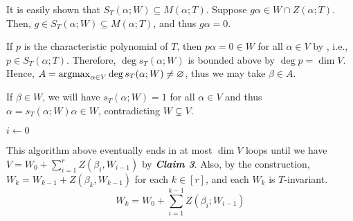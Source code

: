 \documentclass[MAS212_Note.tex]{subfiles}
\begin{document}
{    

    It is easily shown that \(S_T(\alpha; W) \subseteq M(\alpha; T)\).
    Suppose \(g \alpha \in W \cap Z(\alpha; T)\).
    Then, \(g \in S_T(\alpha; W) \subseteq M(\alpha; T)\),
    and thus \(g \alpha = 0\). \checkmark
    


    If \(p\) is the characteristic polynomial of \(T\),
    then \(p \alpha = 0 \in W\) for all \(\alpha \in V\) by ,
    i.e., \(p \in S_T(\alpha; T)\).
    Therefore, \(\deg s_T(\alpha; W)\) is bounded above by \(\deg p = \dim V\).
    Hence, \(A = \operatorname*{arg max}_{\alpha \in V} \deg s_T(\alpha; W) \neq \varnothing\), thus we may
    take \(\beta \in A\).

    If \(\beta \in W\), we will have \(s_T(\alpha; W) = 1\) for all \(\alpha \in V\)
    and thus \(\alpha = s_T(\alpha; W) \alpha \in W\),
    contradicting \(W \subsetneq V\). \checkmark\par
    {
        \setlength{\interspacetitleruled}{0pt}%
        \setlength{\algotitleheightrule}{0pt}%
        \LinesNumberedHidden%
        \begin{algorithm}[H]
            \(i \gets 0\)\;
        \end{algorithm}
    }

    This algorithm above eventually ends in at most \(\dim V\) loops
    until we have \(V = W_0 + \sum_{i=1}^{r} Z(\beta_i, W_{i-1})\) by \textbf{\textit{Claim 3}}.
    Also, by the construction, \(W_k = W_{k-1} + Z(\beta_k, W_{k-1})\)
    for each \(k \in [r]\),
    and each \(W_k\) is \(T\)-invariant.
    \[
        \textstyle W_k = W_0 + \sum_{i=1}^{k-1} Z(\beta_i; W_{i-1})
    \]

}
\end{document}
